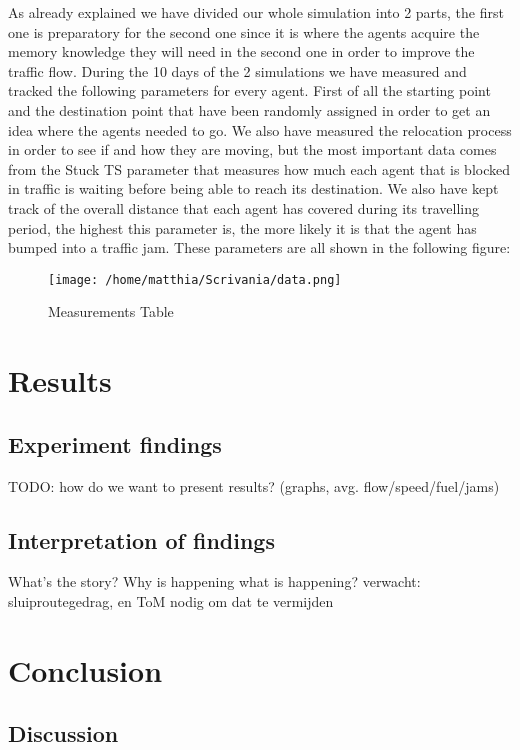\documentclass[a4paper,hidelinks]{article}
\begin{document}
As already explained we have divided our whole simulation into 2 parts, the first one is preparatory for the second one since it is where the agents acquire the memory knowledge they will need in the second one in order to improve the traffic flow. During the 10 days of the 2 simulations we have measured and tracked the following parameters for every agent. First of all the starting point and the destination point that have been randomly assigned in order to get an idea where the agents needed to go. We also have measured the relocation process in order to see if and how they are moving, but the most important data comes from the Stuck TS parameter that measures how much each agent that is blocked in traffic is waiting before being able to reach its destination. We also have kept track of the overall distance that each agent has covered during its travelling period, the highest this parameter is, the more likely it is that the agent has bumped into a traffic jam. These parameters are all shown in the following figure:

\begin{figure}[ht!]
\centering
\texttt{[image: /home/matthia/Scrivania/data.png]}
\caption{Measurements Table \label{overflow}}
\end{figure} 


\section{Results}
\subsection{Experiment findings}
TODO: how do we want to present results? (graphs, avg. flow/speed/fuel/jams)

\subsection{Interpretation of findings}
What's the story? Why is happening what is happening? verwacht: sluiproutegedrag, en ToM nodig om dat te vermijden

\section{Conclusion}
\subsection{Discussion}
\end{document}

